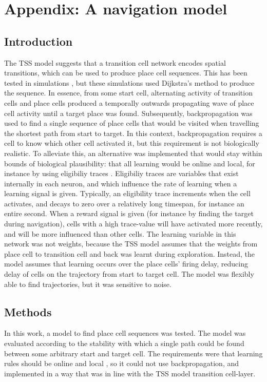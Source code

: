 \documentclass{article}
\begin{document}
    \printbibliography{}

    \newpage
    \appendix
    \section{Appendix: A navigation model} \label{Appendix}
    \subsection{Introduction}
    The TSS model suggests that a transition cell network encodes spatial transitions, which can be used to produce place cell sequences. This has been tested in simulations \parencite{Waniek2020}, but these simulations used Dijkstra's method to produce the sequence. In essence, from some start cell, alternating activity of transition cells and place cells produced a temporally outwards propagating wave of place cell activity until a target place was found. Subsequently, backpropagation was used to find a single sequence of place cells that would be visited when travelling the shortest path from start to target. In this context, backpropagation requires a cell to know which other cell activated it, but this requirement is not biologically realistic.
    To alleviate this, an alternative was implemented that would stay within bounds of biological plausibility: that all learning would be online and local, for instance by using eligibiliy traces \parencite{VanDerVeen2022}. Eligibiliy traces are variables that exist internally in each neuron, and which influence the rate of learning when a learning signal is given. Typically, an eligibility trace increments when the cell activates, and decays to zero over a relatively long timespan, for instance an entire second. When a reward signal is given (for instance by finding the target during navigation), cells with a high trace-value will have activated more recently, and will be more influenced than other cells.
    The learning variable in this network was not weights, because the TSS model assumes that the weights from place cell to transition cell and back was learnt during exploration. Instead, the model assumes that learning occurs over the place cells' firing delay, reducing delay of cells on the trajectory from start to target cell. The model was flexibly able to find trajectories, but it was sensitive to noise.

    \subsection{Methods}
    In this work, a model to find place cell sequences was tested. The model was evaluated according to the stability with which a single path could be found between some arbitrary start and target cell. The requirements were that learning rules should be online and local \parencite{VanDerVeen2022}, so it could not use backpropagation, and implemented in a way that was in line with the TSS model transition cell-layer.
\end{document}
